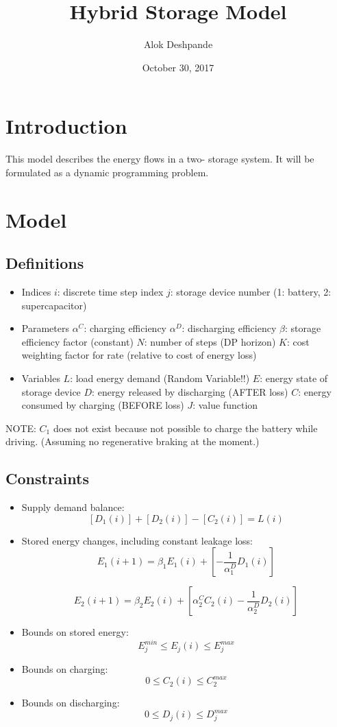 \documentclass{article}
\title{Hybrid Storage Model}
\author{Alok Deshpande}
\date{October 30, 2017}
\begin{document}
	
	\maketitle
	
	\section{Introduction}
	This model describes the energy flows in a two- storage system. It will be formulated as a dynamic programming problem.
	
	\section{Model}
	
	\subsection{Definitions}
	\begin{itemize}
		\item Indices
		$i$: discrete time step index
		$j$: storage device number (1: battery, 2: supercapacitor)
		\item Parameters
		$\alpha^{C}$: charging efficiency
		$\alpha^{D}$: discharging efficiency
		$\beta$: storage efficiency factor (constant)
		$N$: number of steps (DP horizon)
		$K$: cost weighting factor for rate (relative to cost of energy loss)
		\item Variables
		$L$: load energy demand (Random Variable!!)
		$E$: energy state of storage device
		$D$: energy released by discharging (AFTER loss)
		$C$: energy consumed by charging (BEFORE loss)
		$J$: value function
	\end{itemize}
	
	NOTE: $C_{1}$ does not exist because not possible to charge the battery while driving. (Assuming no regenerative braking at the moment.)
	
	\subsection{Constraints}
	\begin{itemize}
		\item Supply demand balance: 
		\[ \left[D_{1}(i)\right] + \left[D_{2}(i)\right] - \left[C_{2}(i)\right] = L(i) \]
		\item Stored energy changes, including constant leakage loss:
		\[E_{1}(i+1)=\beta_{1}E_{1}(i)+\left[-\frac{1}{\alpha_{1}^{D}}D_{1}(i)\right] \]
		
		\[E_{2}(i+1)=\beta_{2}E_{2}(i)+\left[\alpha_{2}^{C}C_{2}(i)-\frac{1}{\alpha_{2}^{D}}D_{2}(i)\right] \]
		
		\item Bounds on stored energy: 
		\[E_{j}^{min}\leq E_{j}(i)\leq E_{j}^{max}\]
		\item Bounds on charging:
		\[0\leq C_{2}(i)\leq C_{2}^{max}\]
		\item Bounds on discharging:
		\[0\leq D_{j}(i)\leq D_{j}^{max}\]
	\end{itemize}
\end{document}
